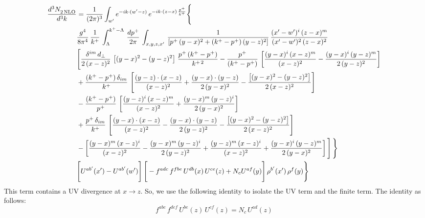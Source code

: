 \documentclass[9pt]{article}
\numberwithin{equation}{section}
\begin{document}
\begin{align}
    \frac{d^{3}N_{2\,\rm NLO}^{\rm}}{d^{3}k}  & =  \frac{1}{(2\pi)^{3}}  \int_{ w^\prime} e^{-ik\cdot(w'-z)}\,e^{-ik\cdot (z-x)\,\frac{p^{+}}{k^{+}}} \Bigg\{\notag \\ & \frac{g^{4}}{8\pi^{4}}\,\frac{1}{k^{+}}\,\int_{\Lambda}^{k^{+}-\Lambda}\, \frac{dp^{+}}{2\pi} \, \int_{x,y,z,x'}\,\frac{1}{\left[p^{+}\,(y-x)^{2}+(k^{+}-p^{+})\,(y-z)^{2}\right]}\, \frac{(x'-w')^{i}\,(z-x)^{m}}{(x'-w')^{2}\,(z-x)^{2}} \notag \\ & \Bigg[\frac{\delta^{im}\,d_{\perp}}{2\,(x-z)^{2}}\,\left[(y-x)^{2}-(y-z)^{2}\right]\,\frac{p^{+}\,(k^{+}-p^{+})}{k^{+\,2}}-\frac{p^{+}}{(k^{+}-p^{+})}\,\left[\frac{(y-x)^{i}\,(x-z)^{m}}{(x-z)^{2}}-\frac{(y-x)^{i}\,(y-z)^{m}}{2\,(y-z)^{2}}\right]\notag \\ & +\frac{(k^{+}-p^{+})\,\delta_{im}}{k^{+}}\,\left[\frac{(y-z)\cdot (x-z)}{(x-z)^{2}}+\frac{(y-x)\cdot (y-z)}{2\,(y-x)^{2}}-\frac{\left[(y-x)^{2}-(y-z)^{2}\right]}{2\,(x-z)^{2}}\right]\notag \\ & -\frac{(k^{+}-p^{+})}{p^{+}}\,\left[\frac{(y-z)^{i}\,(x-z)^{m}}{(x-z)^{2}}+\frac{(y-x)^{m}\,(y-z)^{i}}{2\,(y-x)^{2}}\right]\notag \\ & +\frac{p^{+}\,\delta_{im}}{k^{+}}\,\left[\frac{(y-x)\cdot (x-z)}{(x-z)^{2}}-\frac{(y-x)\cdot (y-z)}{2\,(y-z)^{2}}-\frac{\left[(y-x)^{2}-(y-z)^{2}\right]}{2\,(x-z)^{2}}\right]\notag \\ &-\left[\frac{(y-x)^{m}\,(x-z)^{i}}{(x-z)^{2}}-\frac{(y-x)^{m}\,(y-z)^{i}}{2\,(y-z)^{2}}+\frac{(y-z)^{m}\,(x-z)^{i}}{(x-z)^{2}}+\frac{(y-x)^{i}\,(y-z)^{m}}{2\,(y-x)^{2}}\right]\Bigg]\,\Bigg\} \notag \\ & \Bigg[U^{ab'}(x')-U^{ab'}(w')\Bigg]\,\Bigg[-f^{adc}\,f^{fbe}\,U^{db}(x)\,U^{ce}(z)+N_{c}U^{af}(y)\Bigg]\,\rho^{b'}(x')\,\rho^{f}(y)\Bigg\}
\end{align}
This term contains a UV divergence at $x\rightarrow z$.  So, we use the following identity to isolate the UV term and the finite term. The identity as follows:
$$f^{abc}\,f^{def}\,U^{be}(z)\,U^{cf}(z) = N_{c}\,U^{ad}(z)$$
\end{document}

